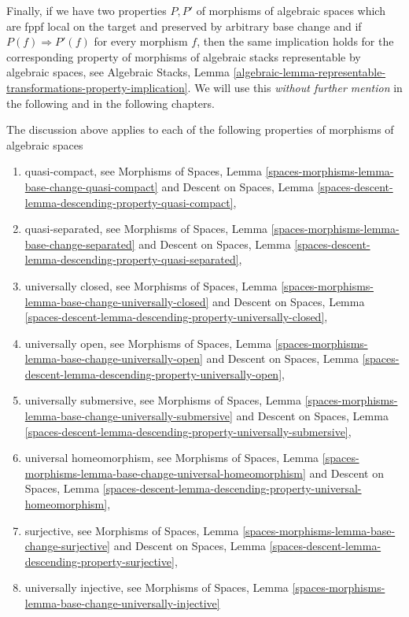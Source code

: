 \documentclass{stacks-project}
\theoremstyle{plain}
\theoremstyle{definition}
\theoremstyle{remark}
\numberwithin{equation}{subsection}
\begin{document}
\medskip\noindent
Finally, if we have two properties $P, P'$ of morphisms of algebraic spaces
which are fppf local on the target and preserved by arbitrary base change
and if $P(f) \Rightarrow P'(f)$ for every morphism $f$, then the same
implication holds for the corresponding property of morphisms of algebraic
stacks representable by algebraic spaces, see
Algebraic Stacks, Lemma
\ref{algebraic-lemma-representable-transformations-property-implication}.
We will use this {\it without further mention} in the following and in the
following chapters.

\medskip\noindent
The discussion above applies to each of the following properties of
morphisms of algebraic spaces
\begin{enumerate}
\item quasi-compact, see
Morphisms of Spaces,
Lemma \ref{spaces-morphisms-lemma-base-change-quasi-compact}
and
Descent on Spaces,
Lemma \ref{spaces-descent-lemma-descending-property-quasi-compact},
\item quasi-separated, see
Morphisms of Spaces,
Lemma \ref{spaces-morphisms-lemma-base-change-separated}
and
Descent on Spaces,
Lemma \ref{spaces-descent-lemma-descending-property-quasi-separated},
\item universally closed, see
Morphisms of Spaces,
Lemma \ref{spaces-morphisms-lemma-base-change-universally-closed}
and
Descent on Spaces,
Lemma \ref{spaces-descent-lemma-descending-property-universally-closed},
\item universally open, see
Morphisms of Spaces,
Lemma \ref{spaces-morphisms-lemma-base-change-universally-open}
and
Descent on Spaces,
Lemma \ref{spaces-descent-lemma-descending-property-universally-open},
\item universally submersive, see
Morphisms of Spaces,
Lemma \ref{spaces-morphisms-lemma-base-change-universally-submersive}
and
Descent on Spaces,
Lemma \ref{spaces-descent-lemma-descending-property-universally-submersive},
\item universal homeomorphism, see
Morphisms of Spaces,
Lemma \ref{spaces-morphisms-lemma-base-change-universal-homeomorphism}
and
Descent on Spaces,
Lemma \ref{spaces-descent-lemma-descending-property-universal-homeomorphism},
\item surjective, see
Morphisms of Spaces,
Lemma \ref{spaces-morphisms-lemma-base-change-surjective}
and
Descent on Spaces,
Lemma \ref{spaces-descent-lemma-descending-property-surjective},
\item universally injective, see
Morphisms of Spaces,
Lemma \ref{spaces-morphisms-lemma-base-change-universally-injective}

\end{enumerate}
\end{document}
